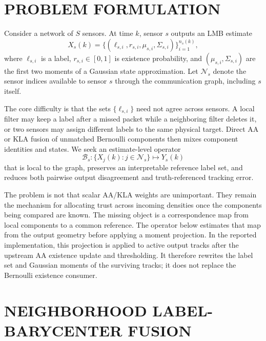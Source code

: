 \documentclass{IEEEtaes}
\begin{document}
\section{PROBLEM FORMULATION}
Consider a network of $S$ sensors. At time $k$, sensor $s$ outputs an LMB estimate
\begin{equation}
  X_s(k)=\{(\ell_{s,i},r_{s,i},\mu_{s,i},\Sigma_{s,i})\}_{i=1}^{n_s(k)},
\end{equation}
where $\ell_{s,i}$ is a label, $r_{s,i}\in[0,1]$ is existence probability, and $(\mu_{s,i},\Sigma_{s,i})$ are the first two moments of a Gaussian state approximation. Let $\mathcal{N}_s$ denote the sensor indices available to sensor $s$ through the communication graph, including $s$ itself.

The core difficulty is that the sets $\{\ell_{s,i}\}$ need not agree across sensors. A local filter may keep a label after a missed packet while a neighboring filter deletes it, or two sensors may assign different labels to the same physical target. Direct AA or KLA fusion of unmatched Bernoulli components then mixes component identities and states. We seek an estimate-level operator
\begin{equation}
  \mathcal{B}_s:\{X_j(k):j\in\mathcal{N}_s\}\mapsto Y_s(k)
\end{equation}
that is local to the graph, preserves an interpretable reference label set, and reduces both pairwise output disagreement and truth-referenced tracking error.

The problem is not that scalar AA/KLA weights are unimportant. They remain the mechanism for allocating trust across incoming densities once the components being compared are known. The missing object is a correspondence map from local components to a common reference. The operator below estimates that map from the output geometry before applying a moment projection.
In the reported implementation, this projection is applied to active output tracks after the upstream AA existence update and thresholding. It therefore rewrites the label set and Gaussian moments of the surviving tracks; it does not replace the Bernoulli existence consumer.

\section{NEIGHBORHOOD LABEL-BARYCENTER FUSION}
\end{document}
